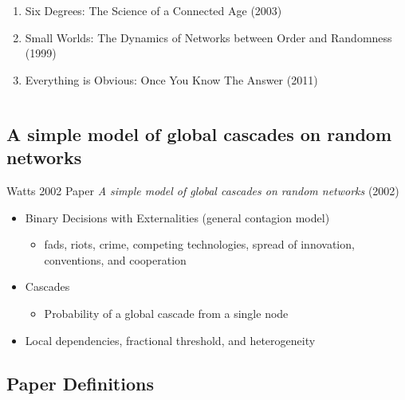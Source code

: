 \documentclass[compress]{beamer}
\begin{document}
\begin{frame}[Basic2]
\begin{columns}
\begin{column}{0.6\textwidth}
\begin{itemize}
\begin{enumerate}
                        \footnotesize
                        \item Six Degrees: The Science of a Connected Age (2003)
                        \item Small Worlds: The Dynamics of Networks between Order and Randomness (1999)
                        \item Everything is Obvious: Once You Know The Answer (2011)
                    \end{enumerate}
                \end{itemize}
            \end{column}
        \end{columns}
    \end{frame}

\subsection{A simple model of global cascades on random networks}

    \begin{frame}[Basic2]{Watts 2002 Paper}
        \textit{A simple model of global cascades on random networks} (2002)
        
        \begin{itemize}
            \item Binary Decisions with Externalities (general contagion model)
            \begin{itemize}
                \item fads, riots, crime, competing technologies, spread of innovation, conventions, and cooperation
            \end{itemize}
            \item Cascades
            \begin{itemize}
                \item Probability of a global cascade from a single node
            \end{itemize}
            \item Local dependencies, fractional threshold, and heterogeneity
        \end{itemize}
    \end{frame}

\subsection{Paper Definitions}
\end{document}
